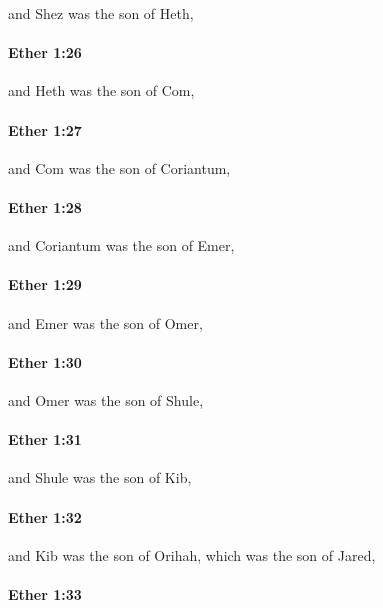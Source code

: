 			and Shez was the son of Heth,

		\paragraph{Ether 1:26} %
			\label{ETHER-1-26}

			and Heth was the son of Com,

		\paragraph{Ether 1:27} %
			\label{ETHER-1-27}

			and Com was the son of Coriantum,

		\paragraph{Ether 1:28} %
			\label{ETHER-1-28}

			and Coriantum was the son of Emer,

		\paragraph{Ether 1:29} %
			\label{ETHER-1-29}

			and Emer was the son of Omer,

		\paragraph{Ether 1:30} %
			\label{ETHER-1-30}

			and Omer was the son of Shule,

		\paragraph{Ether 1:31} %
			\label{ETHER-1-31}

			and Shule was the son of Kib,

		\paragraph{Ether 1:32} %
			\label{ETHER-1-32}

			and Kib was the son of Orihah,
			which was the son of Jared,

		\paragraph{Ether 1:33} %
			\label{ETHER-1-33}

